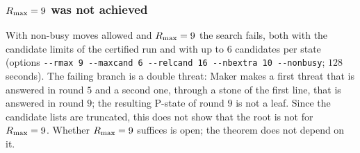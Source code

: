 \subsubsection*{$R_{\max}=9$ was not achieved}
With non-busy moves allowed and $R_{\max}=9$ the search fails, both with the candidate limits of the
certified run and with up to $6$ candidates per state (options \texttt{-{}-rmax 9 -{}-maxcand 6 -{}-relcand 16 -{}-nbextra 10 -{}-nonbusy};
$128$ seconds). The failing branch is a double threat: Maker makes a first threat that is answered in round
$5$ and a second one, through a stone of the first line, that is answered in round $9$; the resulting P-state
of round $9$ is not a leaf. Since the candidate lists are truncated, this does not show that the root is not
\WON{} for $R_{\max}=9$. Whether $R_{\max}=9$ suffices is open; the theorem does not depend on it.
